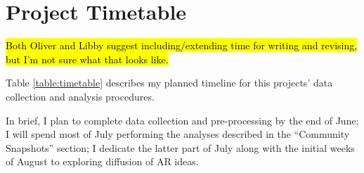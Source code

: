 \documentclass[acmlarge, screen, authorversion]{acmart}
\begin{document}
\section{Project Timetable}

\hl{Both Oliver and Libby suggest including/extending time for writing and revising, but I'm not sure what that looks like.}

Table \ref{table:timetable} describes my planned timeline for this projects' data collection and analysis procedures.

In brief, I plan to complete data collection and pre-processing by the end of June; I will spend most of July performing the analyses described in the ``Community Snapshots'' section; I dedicate the latter part of July along with the initial weeks of August to exploring diffusion of AR ideas.


\end{document}
